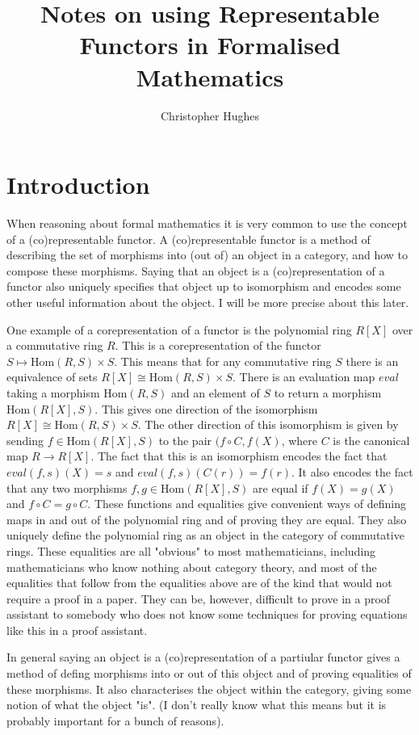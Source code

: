 \documentclass[12pt]{article} %
\title{Notes on using Representable Functors in Formalised Mathematics}
\author{Christopher Hughes}
\theoremstyle{definition}
\theoremstyle{definition}
\theoremstyle{definition}
\theoremstyle{definition}
\begin{document}
\section{Introduction}

When reasoning about formal mathematics it is very common to use the concept of a (co)representable functor. A (co)representable
functor is a method of describing the set of morphisms into (out of) an object in a category, and how to compose these morphisms.
Saying that an object is a (co)representation of a functor also uniquely specifies that object up to isomorphism and encodes
some other useful information about the object. I will be more precise about this later.

One example of a corepresentation of a functor is the polynomial ring $R[X]$ over a commutative ring $R$. This is a corepresentation
of the functor $S \mapsto \text{Hom}(R, S) \times S$. This means that for any commutative ring $S$ there is an
equivalence of sets $R[X] \cong \text{Hom}(R, S) \times S$. There is an evaluation map $eval$ taking a morphism $\text{Hom}(R, S)$ and
an element of $S$ to return a morphism $\text{Hom}(R[X], S)$. This gives one direction of the isomorphism $R[X] \cong \text{Hom}(R, S) \times S$.
The other direction of this isomorphism is given by sending $f \in \text{Hom}(R[X], S)$ to the pair
$(f \circ C, f(X)$, where $C$ is the canonical map $R \to R[X]$. The fact that this is an isomorphism encodes the fact that
$eval(f, s)(X) = s$ and $eval(f, s)(C(r)) = f(r)$. It also encodes the fact that any two morphisms
$f, g \in \text{Hom}(R[X], S)$ are equal if $f(X) = g(X)$ and $f \circ C = g \circ C$. These functions and equalities
give convenient ways of defining maps in and out of the polynomial ring and of proving they are equal. They also uniquely
define the polynomial ring as an object in the category of commutative rings. These equalities are all "obvious" to most
mathematicians, including mathematicians who know nothing about category theory, and most of the equalities that follow
from the equalities above are of the kind that would not require
a proof in a paper. They can be, however, difficult to prove in a proof assistant to somebody who does not know
some techniques for proving equations like this in a proof assistant.

In general saying an object is a (co)representation of a partiular functor gives a method of defing morphisms
into or out of this object and of proving equalities of these morphisms. It also characterises the object within the
category, giving some notion of what the object "is". (I don't really know what this means but it is probably important
for a bunch of reasons).
\end{document}
